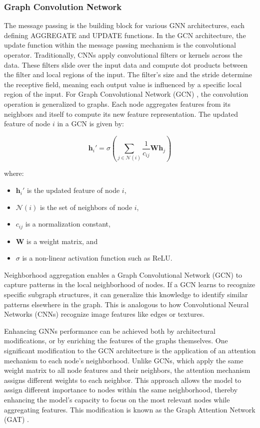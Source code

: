 \subsubsection{Graph Convolution Network}
The message passing is the building block for various GNN architectures, each defining AGGREGATE and UPDATE functions. In the GCN architecture, the update function within the message passing mechanism is the convolutional operator\cite{zhou_graph_2020}. Traditionally, CNNs apply convolutional filters or kernels across the data. These filters slide over the input data and compute dot products between the filter and local regions of the input. The filter's size and the stride determine the receptive field, meaning each output value is influenced by a specific local region of the input. For Graph Convolutional Network (GCN) , the convolution operation is generalized to graphs. Each node aggregates features from its neighbors and itself to compute its new feature representation.
The updated feature of node \(i\) in a GCN is given by:

\[
\mathbf{h}_i' = \sigma \left( \sum_{j \in \mathcal{N}(i)} \frac{1}{c_{ij}} \mathbf{W} \mathbf{h}_j \right)
\]

where:
\begin{itemize}
    \item \(\mathbf{h}_i'\) is the updated feature of node \(i\),
    \item \(\mathcal{N}(i)\) is the set of neighbors of node \(i\),
    \item \(c_{ij}\) is a normalization constant,
    \item \(\mathbf{W}\) is a weight matrix, and
    \item \(\sigma\) is a non-linear activation function such as ReLU\cite{kipf_semi-supervised_2017}.
\end{itemize}
Neighborhood aggregation enables a Graph Convolutional Network (GCN) to capture patterns in the local neighborhood of nodes. If a GCN learns to recognize specific subgraph structures, it can generalize this knowledge to identify similar patterns elsewhere in the graph. This is analogous to how Convolutional Neural Networks (CNNs) recognize image features like edges or textures.

Enhancing GNNs performance can be achieved both by architectural modifications, or by enriching the features of the graphs themselves. One significant modification to the GCN architecture is the application of an attention mechanism to each node’s neighborhood. Unlike GCNs, which apply the same weight matrix to all node features and their neighbors, the attention mechanism assigns different weights to each neighbor. This approach allows the model to assign different importance to nodes within the same neighborhood, thereby enhancing the model's capacity to focus on the most relevant nodes while aggregating features. This modification is known as the Graph Attention Network (GAT) \cite{velickovic_graph_2018}.

